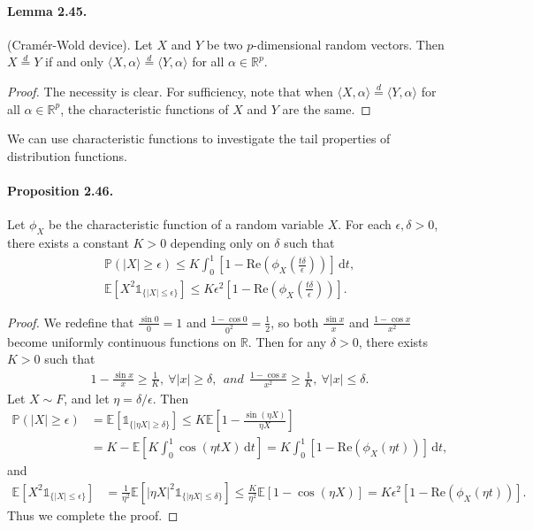 \documentclass{article}
\numberwithin{equation}{section}
\newcommand{\E}{\mathbb{E}}
\renewcommand{\P}{\mathbb{P}}
\renewcommand{\d}{\mathrm{d}}
\renewcommand{\Re}{\mathrm{Re}}
\theoremstyle{plain}
\theoremstyle{definition}
\begin{document}
\paragraph{Lemma 2.45.\label{lemma:2.45}} (Cramér-Wold device). Let $X$ and $Y$ be two $p$-dimensional random vectors. Then $X\overset{d}{=}Y$ if and only $\langle X,\alpha\rangle\overset{d}{=}\langle Y,\alpha\rangle$ for all $\alpha\in\mathbb{R}^p$.
\begin{proof}
The necessity is clear. For sufficiency, note that when $\langle X,\alpha\rangle\overset{d}{=}\langle Y,\alpha\rangle$ for all $\alpha\in\mathbb{R}^p$, the characteristic functions of $X$ and $Y$ are the same.
\end{proof}

We can use characteristic functions to investigate the tail properties of distribution functions.

\paragraph{Proposition 2.46.\label{prop:2.46}} Let $\phi_X$ be the characteristic function of a random variable $X$. For each $\epsilon,\delta>0$, there exists a constant $K>0$ depending only on $\delta$ such that
\begin{align*}
	\P(\vert X\vert\geq\epsilon)\leq K\int_0^1\left[1-\Re\left(\phi_X\left(\frac{t\delta}{\epsilon}\right)\right)\right]\,\d t,\\
	\E\left[X^2\mathds{1}_{\{\vert X\vert\leq\epsilon\}}\right]\leq K\epsilon^2\left[1-\Re\left(\phi_X\left(\frac{t\delta}{\epsilon}\right)\right)\right].
\end{align*}
\begin{proof}
	We redefine that $\frac{\sin 0}{0}=1$ and $\frac{1-\cos 0}{0^2}=\frac{1}{2}$, so both $\frac{\sin x}{x}$ and $\frac{1-\cos x}{x^2}$ become uniformly continuous functions on $\mathbb{R}$. Then for any $\delta>0$, there exists $K>0$ such that
	\begin{align*}
		1-\frac{\sin x}{x}\geq\frac{1}{K},\ \forall\vert x\vert\geq\delta,\ \ \textit{and}\ \ \frac{1-\cos x}{x^2}\geq\frac{1}{K},\ \forall \vert x\vert\leq\delta.
	\end{align*}
	Let $X\sim F$, and let $\eta=\delta/\epsilon$. Then
	\begin{align*}
		\P\left(\vert X\vert\geq\epsilon\right) &= \E\left[\mathds{1}_{\{\vert\eta X\vert\geq\delta\}}\right] \leq K\E\left[1-\frac{\sin(\eta X)}{\eta X}\right]\\
		&= K - \E\left[K\int_0^1\cos(\eta tX)\,\d t\right] = K\int_0^1\left[1-\Re\left(\phi_X(\eta t)\right)\right]\,\d t,\tag{By Fubini's theorem}
	\end{align*}
    and
    \begin{align*}
		\E\left[X^2\mathds{1}_{\{\vert X\vert\leq\epsilon\}}\right]&=\frac{1}{\eta^2}\E\left[\vert\eta X\vert^2\mathds{1}_{\{\vert \eta X\vert\leq\delta\}}\right]\leq \frac{K}{\eta^2}\E\left[1-\cos(\eta X)\right] = K\epsilon^2\left[1-\Re\left(\phi_X(\eta t)\right)\right].
	\end{align*}
	Thus we complete the proof.
\end{proof}
\end{document}
